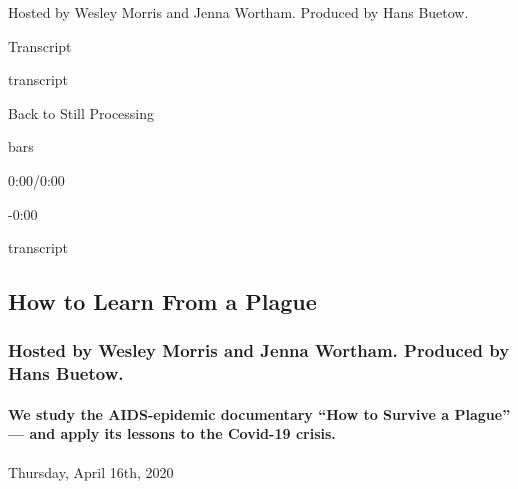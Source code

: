 Hosted by Wesley Morris and Jenna Wortham. Produced by Hans Buetow.

Transcript

transcript

Back to Still Processing

bars

0:00/0:00

-0:00

transcript

\hypertarget{how-to-learn-from-a-plague-2}{%
\subsection{How to Learn From a
Plague}\label{how-to-learn-from-a-plague-2}}

\hypertarget{hosted-by-wesley-morris-and-jenna-wortham-produced-by-hans-buetow-1}{%
\subsubsection{Hosted by Wesley Morris and Jenna Wortham. Produced by
Hans
Buetow.}\label{hosted-by-wesley-morris-and-jenna-wortham-produced-by-hans-buetow-1}}

\hypertarget{we-study-the-aids-epidemic-documentary-how-to-survive-a-plague--and-apply-its-lessons-to-the-covid-19-crisis-2}{%
\paragraph{We study the AIDS-epidemic documentary ``How to Survive a
Plague'' --- and apply its lessons to the Covid-19
crisis.}\label{we-study-the-aids-epidemic-documentary-how-to-survive-a-plague--and-apply-its-lessons-to-the-covid-19-crisis-2}}

Thursday, April 16th, 2020

